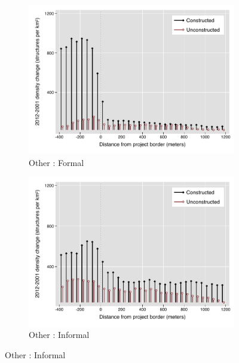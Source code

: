 \documentclass[12pt]{article}
\begin{document}
\begin{figure}
\begin{subfigure}[b]{0.495\textwidth}
        \end{subfigure}
        \begin{subfigure}[b]{0.495\textwidth}  
            \centering 
            \caption{Other : Formal}
            \includegraphics[width=\textwidth,trim={0.3cm .3cm 0.1cm 0cm}, clip=true]{figures/bblu_for_rawchanges_4_3.pdf}
        \end{subfigure}
        \hfill
        \begin{subfigure}[b]{0.495\textwidth}
            \centering
            \caption{Other : Informal}
            \includegraphics[width=\textwidth,trim={0.3cm .3cm 0.1cm 0cm}, clip=true]{figures/bblu_inf_rawchanges_4_3.pdf}
        \end{subfigure}
    \end{figure} 
\end{document}
